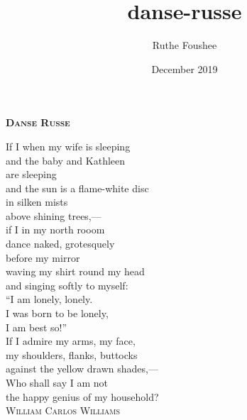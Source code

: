 \documentclass[12pt]{memoir}
\title{danse-russe}
\author{Ruthe Foushee}
\date{December 2019}
\begin{document}
\thispagestyle{empty}

\textbf{\textsc{\large Danse Russe}}
\vspace{26pt}

If I when my wife is sleeping\\
and the baby and Kathleen\\
are sleeping\\
and the sun is a flame-white disc\\
in silken mists\\
above shining trees,---\\
if I in my north rooom\\
dance naked, grotesquely\\
before my mirror\\
waving my shirt round my head\\
and singing softly to myself:\\
``I am lonely, lonely.\\
I was born to be lonely,\\
I am best so!''\\
If I admire my arms, my face,\\
my shoulders, flanks, buttocks\\
against the yellow drawn shades,---\\

Who shall say I am not\\
the happy genius of my household?\\

\vspace{40pt}
\textsc{William Carlos Williams}
\vfill
\end{document}
